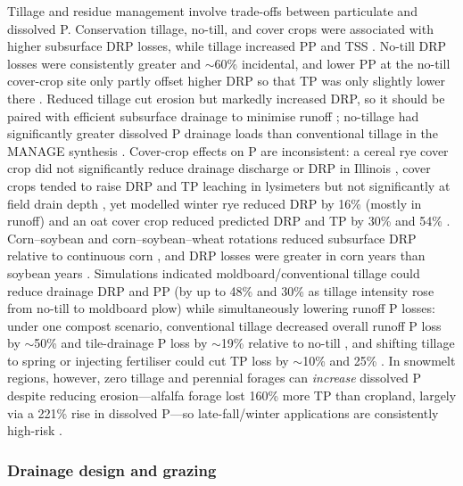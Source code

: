 Tillage and residue management involve trade-offs between particulate and dissolved P.
Conservation tillage, no-till, and cover crops were associated with higher subsurface DRP
losses, while tillage increased PP and TSS \parencite{Ni2020,Macrae2023}. No-till DRP losses were
consistently greater and $\sim$60\% incidental, and lower PP at the no-till cover-crop site only
partly offset higher DRP so that TP was only slightly lower there \parencite{Macrae2023}. Reduced
tillage cut erosion but markedly increased DRP, so it should be paired with efficient subsurface
drainage to minimise runoff \parencite{Koskiaho2002}; no-tillage had significantly greater
dissolved P drainage loads than conventional tillage in the MANAGE synthesis
\parencite{Christianson2016}. Cover-crop effects on P are inconsistent: a cereal rye cover crop
did not significantly reduce drainage discharge or DRP in Illinois \parencite{deOliveira2022},
cover crops tended to raise DRP and TP leaching in lysimeters but not significantly at field drain
depth \parencite{Liu2019}, yet modelled winter rye reduced DRP by 16\% (mostly in runoff)
\parencite{Grewal2025} and an oat cover crop reduced predicted DRP and TP by 30\% and 54\%
\parencite{Askar2021b}. Corn--soybean and corn--soybean--wheat rotations reduced subsurface DRP
relative to continuous corn \parencite{Ni2020}, and DRP losses were greater in corn years than
soybean years \parencite{Zhang2015}. Simulations indicated moldboard/conventional tillage could reduce
drainage DRP and PP (by up to 48\% and 30\% as tillage intensity rose from no-till to
moldboard plow) while simultaneously lowering runoff P losses: under one compost scenario,
conventional tillage decreased overall runoff P loss by $\sim$50\% and tile-drainage P loss by
$\sim$19\% relative to no-till \parencite{Pan2023}, and shifting tillage to spring or injecting fertiliser could cut TP loss by
$\sim$10\% and 25\% \parencite{Qi2018}. In snowmelt regions, however, zero tillage and perennial
forages can \emph{increase} dissolved P despite reducing erosion---alfalfa forage lost 160\% more
TP than cropland, largely via a 221\% rise in dissolved P---so late-fall/winter applications are
consistently high-risk \parencite{Baulch2019}.

\subsubsection{Drainage design and grazing}

